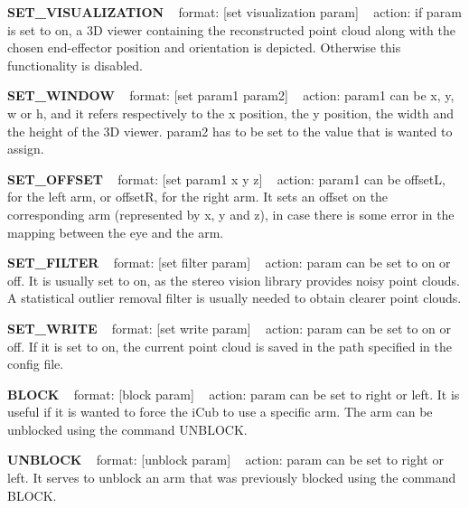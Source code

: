 {\bfseries S\+E\+T\+\_\+\+V\+I\+S\+U\+A\+L\+I\+Z\+A\+T\+I\+O\+N} ~\newline
format\+: \mbox{[}set visualization param\mbox{]} ~\newline
action\+: if param is set to on, a 3\+D viewer containing the reconstructed point cloud along with the chosen end-\/effector position and orientation is depicted. Otherwise this functionality is disabled.

{\bfseries S\+E\+T\+\_\+\+W\+I\+N\+D\+O\+W} ~\newline
format\+: \mbox{[}set param1 param2\mbox{]} ~\newline
action\+: param1 can be x, y, w or h, and it refers respectively to the x position, the y position, the width and the height of the 3\+D viewer. param2 has to be set to the value that is wanted to assign.

{\bfseries S\+E\+T\+\_\+\+O\+F\+F\+S\+E\+T} ~\newline
format\+: \mbox{[}set param1 x y z\mbox{]} ~\newline
action\+: param1 can be offset\+L, for the left arm, or offset\+R, for the right arm. It sets an offset on the corresponding arm (represented by x, y and z), in case there is some error in the mapping between the eye and the arm.

{\bfseries S\+E\+T\+\_\+\+F\+I\+L\+T\+E\+R} ~\newline
format\+: \mbox{[}set filter param\mbox{]} ~\newline
action\+: param can be set to on or off. It is usually set to on, as the stereo vision library provides noisy point clouds. A statistical outlier removal filter is usually needed to obtain clearer point clouds.

{\bfseries S\+E\+T\+\_\+\+W\+R\+I\+T\+E} ~\newline
format\+: \mbox{[}set write param\mbox{]} ~\newline
action\+: param can be set to on or off. If it is set to on, the current point cloud is saved in the path specified in the config file.

{\bfseries B\+L\+O\+C\+K} ~\newline
format\+: \mbox{[}block param\mbox{]} ~\newline
action\+: param can be set to right or left. It is useful if it is wanted to force the i\+Cub to use a specific arm. The arm can be unblocked using the command U\+N\+B\+L\+O\+C\+K.

{\bfseries U\+N\+B\+L\+O\+C\+K} ~\newline
format\+: \mbox{[}unblock param\mbox{]} ~\newline
action\+: param can be set to right or left. It serves to unblock an arm that was previously blocked using the command B\+L\+O\+C\+K.

